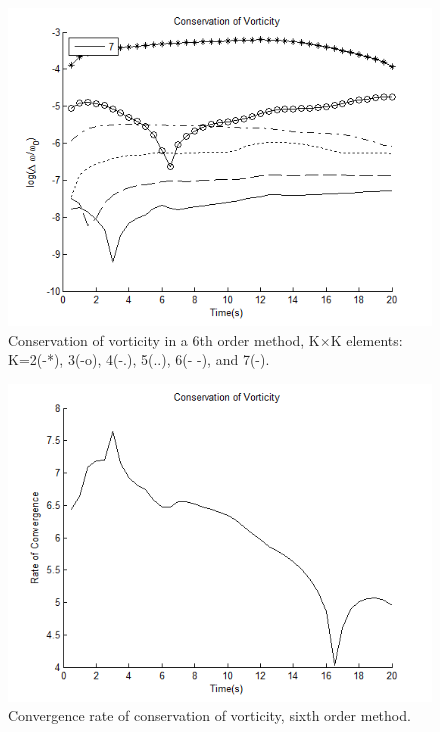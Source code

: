 \documentclass[letterpaper,12pt]{report}
\begin{document}
\begin{figure}
\centering
\includegraphics[width=1\textwidth]{PWconserve.PNG}
\caption{\label{fig:PWconserve}Conservation of vorticity in a 6th order method, K$\times$K elements: K=2(-*), 3(-o), 4(-.), 5(..), 6(- -), and 7(-).}
\end{figure}
\begin{figure}
\centering
\includegraphics[width=1\textwidth]{PWconserveConverge.PNG}
\caption{\label{fig:PWconserveConverge}Convergence rate of conservation of vorticity, sixth order method.}
\end{figure}
%
\end{document}
